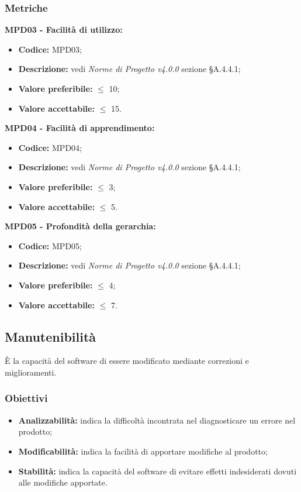 \subsubsection{Metriche}
\textbf{MPD03 - Facilità di utilizzo:}
\begin{itemize}
    \item \textbf{Codice:} MPD03;
    \item \textbf{Descrizione:} vedi \textit{Norme di Progetto v4.0.0} sezione \S A.4.4.1;
    \item \textbf{Valore preferibile:} $\leq$ 10;
    \item \textbf{Valore accettabile:} $\leq$ 15.
\end{itemize}
\textbf{MPD04 - Facilità di apprendimento:}
\begin{itemize}
    \item \textbf{Codice:} MPD04;
    \item \textbf{Descrizione:} vedi \textit{Norme di Progetto v4.0.0} sezione \S A.4.4.1;
    \item \textbf{Valore preferibile:} $\leq$ 3;
    \item \textbf{Valore accettabile:} $\leq$ 5.
\end{itemize}
\textbf{MPD05 - Profondità della gerarchia:}
\begin{itemize}
    \item \textbf{Codice:} MPD05;
    \item \textbf{Descrizione:} vedi \textit{Norme di Progetto v4.0.0} sezione \S A.4.4.1;
    \item \textbf{Valore preferibile:} $\leq$ 4;
    \item \textbf{Valore accettabile:} $\leq$ 7.
\end{itemize}
\subsection{Manutenibilità}
È la capacità del software di essere modificato mediante correzioni e miglioramenti.
\subsubsection{Obiettivi}
\begin{itemize}
    \item \textbf{Analizzabilità:} indica la difficoltà incontrata nel diagnosticare un errore nel prodotto;
    \item \textbf{Modificabilità:} indica la facilità di apportare modifiche al prodotto;
    \item \textbf{Stabilità:} indica la capacità del software di evitare effetti indesiderati dovuti alle modifiche apportate.
\end{itemize}
